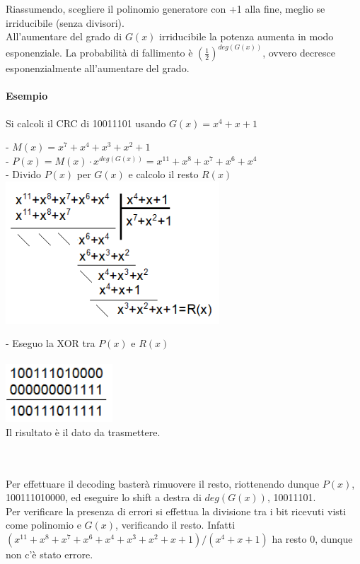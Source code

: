 \documentclass[10pt,a4paper,twoside]{article}
\begin{document}
Riassumendo, scegliere il polinomio generatore con +1 alla fine, meglio se irriducibile (senza divisori).\\
All'aumentare del grado di $G(x)$ irriducibile la potenza aumenta in modo esponenziale. La probabilità di fallimento è $(\frac{1}{2})^{deg(G(x))}$, ovvero decresce esponenzialmente all'aumentare del grado.
\paragraph{Esempio} Si calcoli il CRC di 10011101 usando $G(x)=x^4+x+1$\\
\begin{minipage}{0.5\textwidth}
- $M(x)=x^7+x^4+x^3+x^2+1$\\
- $P(x)=M(x)\cdot x^{deg(G(x))}=x^{11}+x^8+x^7+x^6+x^4$\\
- Divido $P(x)$ per $G(x)$ e calcolo il resto $R(x)$\\
\includegraphics[width=0.6\textwidth]{images/divisione.png}
\end{minipage}
\begin{minipage}{0.5\textwidth}
- Eseguo la XOR tra $P(x)$ e $R(x)$\\\\
\includegraphics[width=0.3\textwidth]{images/xor.png}\\
Il risultato è il dato da trasmettere.
\end{minipage}
\\\\
Per effettuare il decoding basterà rimuovere il resto, riottenendo dunque $P(x)$, 100111010000, ed eseguire lo shift a destra di $deg(G(x))$, 10011101.\\
Per verificare la presenza di errori si effettua la divisione tra i bit ricevuti visti come polinomio e $G(x)$, verificando il resto. Infatti $(x^{11}+x^8+x^7+x^6+x^4+x^3+x^2+x+1)/(x^4+x+1)$ ha resto 0, dunque non c'è stato errore.
\end{document}
